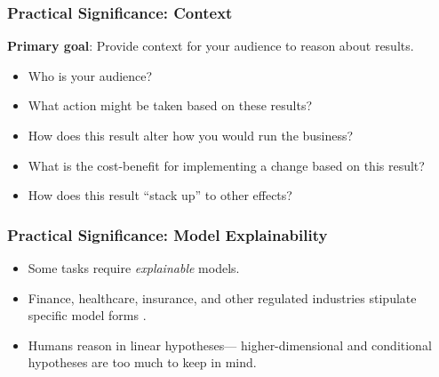 \documentclass[12pt, block=fill]{beamer}
\begin{document}
 \begin{frame}
   \frametitle{Practical Significance: Context}
   \textbf{Primary goal}: Provide context for your audience to reason
   about results.
   \begin{itemize}
   \item Who is your audience? 
   \item What action might be taken based on these results?
   \item How does this result alter how you would run the business? 
   \item What is the cost-benefit for implementing a change based on
     this result? 
   \item How does this result ``stack up'' to other effects?
   \end{itemize}
 \end{frame}

 \begin{frame}
   \frametitle{Practical Significance: Model Explainability}
   \begin{itemize}
   \item Some tasks require \textit{explainable} models.
   \item Finance, healthcare, insurance, and other regulated industries
     stipulate specific model forms .
   \item Humans reason in linear hypotheses— higher-dimensional
     and conditional hypotheses are too much to keep in
     mind.
   \end{itemize}
 \end{frame}
\end{document}
